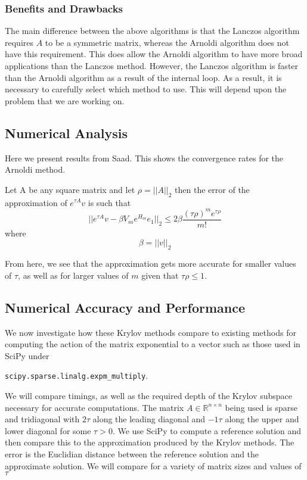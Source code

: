 \subsubsection{Benefits and Drawbacks}
The main difference between the above algorithms is that the Lanczos algorithm requires $A$ to be a symmetric matrix, whereas the Arnoldi algorithm does not have this requirement.
This does allow the Arnoldi algorithm to have more broad applications than the Lanczos method.
However, the Lanczos algorithm is faster than the Arnoldi algorithm as a result of the internal loop.
As a result, it is necessary to carefully select which method to use.
This will depend upon the problem that we are working on.

\subsection{Numerical Analysis}
Here we present results from Saad\cite{Saad1992}. This shows the convergence rates for the Arnoldi method.

\begin{theorem}
    Let A be any square matrix and let \(\rho=||A||_2\) then the error of the approximation of \(e^{\tau A}v\) is such that
    \[ ||e^{\tau A}v - \beta V_m e^{H_m}e_1||_2 \leq 2\beta \frac{(\tau \rho)^m e^{\tau \rho}}{m!} \] where \[\beta = ||v||_2\]
\end{theorem}
From here, we see that the approximation gets more accurate for smaller values of $\tau$, as well as for larger values of $m$ given that $\tau \rho\leq1$.

\subsection{Numerical Accuracy and Performance}
We now investigate how these Krylov methods compare to existing methods for computing the action of the matrix exponential to a vector such as those used in SciPy under 

\verb|scipy.sparse.linalg.expm_multiply|\cite{AlMohy2011}\cite{Higham2010}.

We will compare timings, as well as the required depth of the Krylov subspace necessary for accurate computations.
The matrix $A \in \mathbb{R}^{n \times n}$ being used is sparse and tridiagonal with $2\tau$ along the leading diagonal and $-1\tau$ along the upper and lower diagonal for some $\tau > 0$.
We use SciPy to compute a reference solution and then compare this to the approximation produced by the Krylov methods.
The error is the Euclidian distance between the reference solution and the approximate solution.
We will compare for a variety of matrix sizes and values of $\tau$

